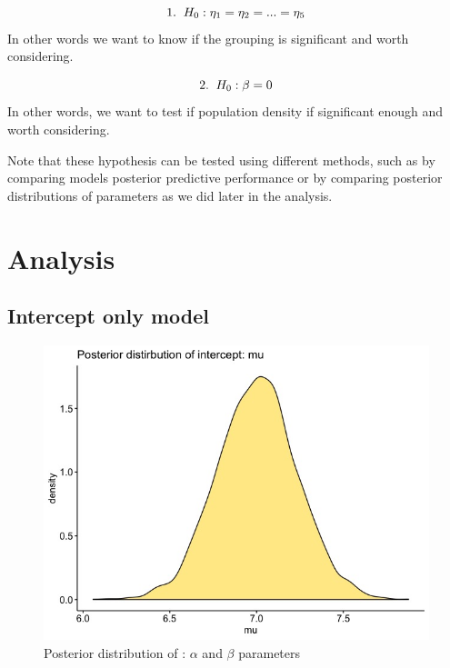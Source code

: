 \documentclass[11pt,twocolumn]{asaproc}
\begin{document}
$$1. \hspace{2mm} H_0: \eta_1 = \eta_2 = ... = \eta_5$$ In other words we want to know if the grouping is significant and worth considering. 

$$2. \hspace{2mm} H_0: \beta = 0$$ In other words, we want to test if population density if significant enough and worth considering. 

Note that these hypothesis can be tested using different methods, such as by comparing models posterior predictive performance or by comparing posterior distributions of parameters as we did later in the analysis. 









\section{Analysis} %

\subsection{Intercept only model}

\begin{figure}[t]
\centering\includegraphics[scale=.30]{interceptM1.jpeg}
\caption{Posterior distribution of : $\alpha$ and $\beta$ parameters}
\label{fig:intercept}
\end{figure}
\end{document}
